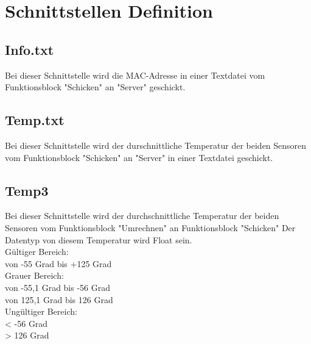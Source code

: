 \section{Schnittstellen Definition}
\subsection{Info.txt}
Bei dieser Schnittstelle wird die MAC-Adresse in einer Textdatei vom Funktionsblock "Schicken" an "Server" geschickt.
\subsection{Temp.txt}
Bei dieser Schnittstelle wird der durschnittliche Temperatur der beiden Sensoren vom Funktionsblock "Schicken" an "Server" in einer Textdatei geschickt.
\subsection{Temp3}
Bei dieser Schnittstelle wird der durchschnittliche Temperatur der beiden Sensoren vom Funktionsblock "Umrechnen" an Funktionsblock "Schicken" Der Datentyp von diesem Temperatur wird Float sein.\\
G\"ultiger Bereich:\\
von -55 Grad bis +125 Grad\\
Grauer Bereich:\\
von -55,1 Grad bis -56 Grad\\
von 125,1 Grad bis 126 Grad\\
Ung\"ultiger Bereich:\\
< -56 Grad\\
> 126 Grad\\
